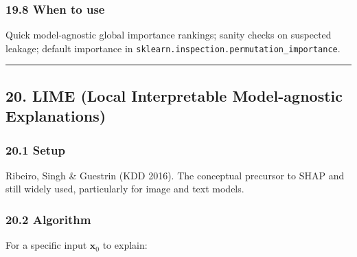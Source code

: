 \documentclass{article}
\begin{document}
\subsubsection{19.8 When to use}\label{198-when-to-use}

Quick model-agnostic global importance rankings; sanity checks on
suspected leakage; default importance in
\texttt{sklearn.inspection.permutation\_importance}.

\begin{center}\rule{0.5\linewidth}{0.5pt}\end{center}

\subsection{20. LIME (Local Interpretable Model-agnostic
Explanations)}\label{20-lime-local-interpretable-model-agnostic-explanations}

\subsubsection{20.1 Setup}\label{201-setup}

Ribeiro, Singh \& Guestrin (KDD 2016). The conceptual precursor to SHAP
and still widely used, particularly for image and text models.

\subsubsection{20.2 Algorithm}\label{202-algorithm}

For a specific input \(\mathbf{x}_0\) to explain:
\end{document}
